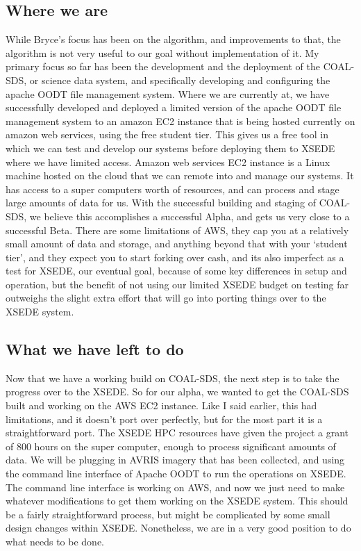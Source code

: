 \documentclass[onecolumn, draftclsnofoot,10pt, compsoc]{IEEEtran}
\begin{document}
\subsection{Where we are}
While Bryce's focus has been on the algorithm, and improvements to that, the algorithm is not very useful to our goal without implementation of it. My primary focus so far has been the development and the deployment of the COAL-SDS, or science data system, and specifically developing and configuring the apache OODT file management system. Where we are currently at, we have successfully developed and deployed a limited version of the apache OODT file management system to an amazon EC2 instance that is being hosted currently on amazon web services, using the free student tier. This gives us a free tool in which we can test and develop our systems before deploying them to XSEDE where we have limited access. Amazon web services EC2 instance is a Linux machine hosted on the cloud that we can remote into and manage our systems. It has access to a super computers worth of resources, and can process and stage large amounts of data for us. With the successful building and staging of COAL-SDS, we believe this accomplishes a successful Alpha, and gets us very close to a successful Beta. There are some limitations of AWS, they cap you at a relatively small amount of data and storage, and anything beyond that with your ‘student tier’, and they expect you to start forking over cash, and its also imperfect as a test for XSEDE, our eventual goal, because of some key differences in setup and operation, but the benefit of not using our limited XSEDE budget on testing far outweighs the slight extra effort that will go into porting things over to the XSEDE system.
\subsection{What we have left to do}
Now that we have a working build on COAL-SDS, the next step is to take the progress over to the XSEDE. So for our alpha, we wanted to get the COAL-SDS built and working on the AWS EC2 instance. Like I said earlier, this had limitations, and it doesn’t port over perfectly, but for the most part it is a straightforward port. The XSEDE HPC resources have given the project a grant of 800 hours on the super computer, enough to process significant amounts of data. We will be plugging in AVRIS imagery that has been collected, and using the command line interface of Apache OODT to run the operations on XSEDE. The command line interface is working on AWS, and now we just need to make whatever modifications to get them working on the XSEDE system. This should be a fairly straightforward process, but might be complicated by some small design changes within XSEDE. Nonetheless, we are in a very good position to do what needs to be done.
\end{document}
